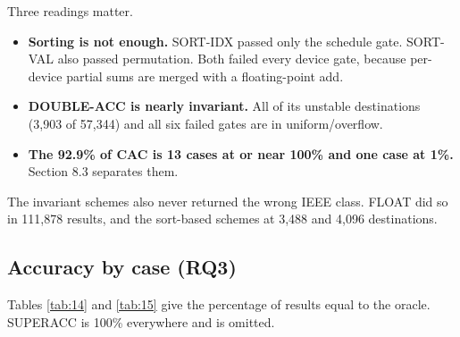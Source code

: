 \documentclass[journal]{IEEEtran}
\begin{document}
Three readings matter.

\begin{itemize}
\item
  \textbf{Sorting is not enough.} SORT-IDX passed only the schedule
  gate. SORT-VAL also passed permutation. Both failed every device gate,
  because per-device partial sums are merged with a floating-point add.
\item
  \textbf{DOUBLE-ACC is nearly invariant.} All of its unstable
  destinations (3,903 of 57,344) and all six failed gates are in
  uniform/overflow.
\item
  \textbf{The 92.9\% of CAC is 13 cases at or near 100\% and one case at
  1\%.} Section 8.3 separates them.
\end{itemize}

The invariant schemes also never returned the wrong IEEE class. FLOAT
did so in 111,878 results, and the sort-based schemes at 3,488 and 4,096
destinations.

\hypertarget{accuracy-by-case-rq3}{%
\subsection{Accuracy by case (RQ3)}\label{accuracy-by-case-rq3}}

Tables \ref{tab:14} and \ref{tab:15} give the percentage of results
equal to the oracle. SUPERACC is 100\% everywhere and is omitted.
\end{document}
